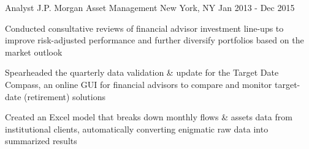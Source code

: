 \begin{cventries}
  \cventry
    {Analyst} %
    {J.P. Morgan Asset Management} %
    {New York, NY} %
    {Jan 2013 - Dec 2015} %
    {
      \begin{cvitems} %
        \item {Conducted consultative reviews of financial advisor investment line-ups to improve risk-adjusted performance and further diversify portfolios based on the market outlook}
        \item {Spearheaded the quarterly data validation \& update for the Target Date Compass, an online GUI for financial advisors to compare and monitor target-date (retirement) solutions}
        \item {Created an Excel model that breaks down monthly flows \& assets data from institutional clients, automatically converting enigmatic raw data into summarized results}
      \end{cvitems}
    }



\end{cventries}
